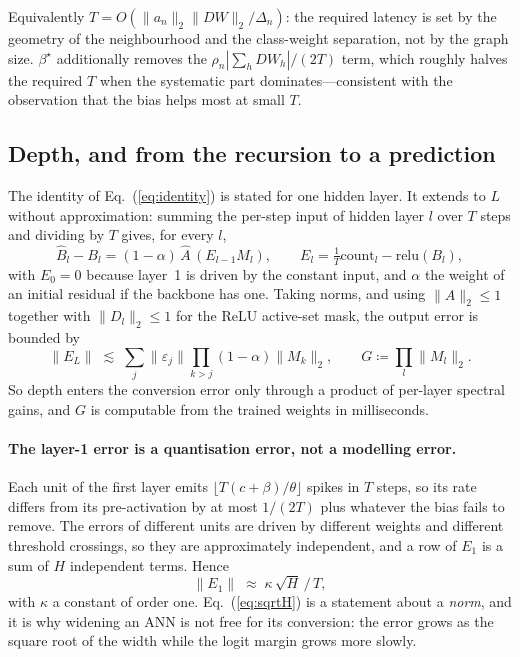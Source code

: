 \documentclass[10pt,twocolumn]{article}
\newcommand{\Ahat}{\hat{A}}
\newcommand{\betastar}{\beta^{\star}}
\newcommand{\anorm}{\lVert a_{n}\rVert_{2}}
\newcommand{\rhon}{\rho_{n}}
\newcommand{\Deltan}{\Delta_{n}}
\newcommand{\eqnref}[1]{Eq.~(\ref{#1})}
\begin{document}
Equivalently $T = O(\anorm \lVert DW\rVert_{2} / \Deltan)$: the required latency is set by the
geometry of the neighbourhood and the class-weight separation, not by the graph size. $\betastar$
additionally removes the $\rhon\left|\sum_{h} DW_{h}\right|/(2T)$ term, which roughly halves the
required $T$ when the systematic part dominates---consistent with the observation that the bias helps
most at small $T$.

\subsection{Depth, and from the recursion to a prediction}
\label{sec:predict}

The identity of \eqnref{eq:identity} is stated for one hidden layer. It extends to $L$ without
approximation: summing the per-step input of hidden layer $l$ over $T$ steps and dividing by $T$
gives, for every $l$,
\begin{equation}
\hat{B}_{l}-B_{l}=(1-\alpha)\,\Ahat\,(E_{l-1}M_{l}),\qquad
E_{l}=\tfrac{1}{T}\mathrm{count}_{l}-\mathrm{relu}(B_{l}),
\label{eq:recursion}
\end{equation}
with $E_{0}=0$ because layer~1 is driven by the constant input, and $\alpha$ the weight of an initial
residual if the backbone has one. Taking norms, and using $\lVert\Ahat\rVert_{2}\le1$ together with
$\lVert D_{l}\rVert_{2}\le1$ for the ReLU active-set mask, the output error is bounded by
\begin{equation}
\lVert E_{L}\rVert\;\lesssim\;\sum_{j}\lVert\varepsilon_{j}\rVert\prod_{k>j}(1-\alpha)\lVert M_{k}\rVert_{2},
\qquad G\coloneqq\prod_{l}\lVert M_{l}\rVert_{2}.
\label{eq:amp}
\end{equation}
So depth enters the conversion error only through a product of per-layer spectral gains, and $G$ is
computable from the trained weights in milliseconds.

\paragraph{The layer-1 error is a quantisation error, not a modelling error.}
Each unit of the first layer emits $\lfloor T(c+\beta)/\theta\rfloor$ spikes in $T$ steps, so its rate
differs from its pre-activation by at most $1/(2T)$ plus whatever the bias fails to remove. The errors
of different units are driven by different weights and different threshold crossings, so they are
approximately independent, and a row of $E_{1}$ is a sum of $H$ independent terms. Hence
\begin{equation}
\lVert E_{1}\rVert \;\approx\; \kappa\,\sqrt{H}\,/\,T ,
\label{eq:sqrtH}
\end{equation}
with $\kappa$ a constant of order one. \eqnref{eq:sqrtH} is a statement about a \emph{norm}, and it is
why widening an ANN is not free for its conversion: the error grows as the square root of the width
while the logit margin grows more slowly.
\end{document}

